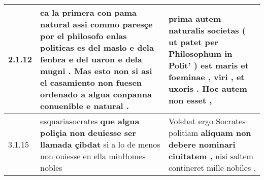 \begin{tabular}{|p{1cm}|p{6.5cm}|p{6.5cm}|}

\hline
2.1.12 & ca la primera con pama natural \textbf{ assi commo paresçe por el philosofo enlas politicas es del maslo e dela fenbra e del uaron e dela mugni . } Mas esto non si asi el casamiento non fuesen ordenado a algua conpanna conuenible e natural . & prima autem naturalis societas ( ut patet per Philosophum in Polit’ ) \textbf{ est maris et foeminae , viri , et uxoris . } Hoc autem non esset , \\\hline
3.1.15 & esquariasocrates \textbf{ que algua poliçia non deuiesse ser llamada çibdat } si a lo de menos non ouiesse en ella minłłomes nobles & Volebat ergo Socrates politiam \textbf{ aliquam non debere nominari ciuitatem , } nisi saltem contineret mille nobiles , \\\hline

\end{tabular}
